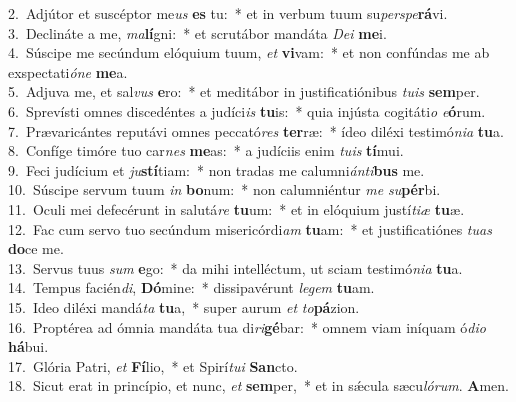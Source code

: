 {2.~}Adjútor et suscéptor me\textit{us} \textbf{es} tu:~* et in verbum tuum su\textit{per}\textit{spe}\textbf{rá}vi.\\
{3.~}Declináte a me, \textit{ma}\textbf{lí}gni:~* et scrutábor mandáta \textit{De}\textit{i} \textbf{me}i.\\
{4.~}Súscipe me secúndum elóquium tuum, \textit{et} \textbf{vi}vam:~* et non confúndas me ab exspectati\textit{ó}\textit{ne} \textbf{me}a.\\
{5.~}Adjuva me, et sal\textit{vus} \textbf{e}ro:~* et meditábor in justificatiónibus \textit{tu}\textit{is} \textbf{sem}per.\\
{6.~}Sprevísti omnes discedéntes a judíci\textit{is} \textbf{tu}is:~* quia injústa cogitáti\textit{o} \textit{e}\textbf{ó}rum.\\
{7.~}Prævaricántes reputávi omnes peccató\textit{res} \textbf{ter}ræ:~* ídeo diléxi testimó\textit{ni}\textit{a} \textbf{tu}a.\\
{8.~}Confíge timóre tuo car\textit{nes} \textbf{me}as:~* a judíciis enim \textit{tu}\textit{is} \textbf{tí}mui.\\
{9.~}Feci judícium et \textit{ju}\textbf{stí}tiam:~* non tradas me calumni\textit{án}\textit{ti}\textbf{bus} me.\\
{10.~}Súscipe servum tuum \textit{in} \textbf{bo}num:~* non calumniéntur \textit{me} \textit{su}\textbf{pér}bi.\\
{11.~}Oculi mei defecérunt in salutá\textit{re} \textbf{tu}um:~* et in elóquium justí\textit{ti}\textit{æ} \textbf{tu}æ.\\
{12.~}Fac cum servo tuo secúndum misericórdi\textit{am} \textbf{tu}am:~* et justificatiónes \textit{tu}\textit{as} \textbf{do}ce me.\\
{13.~}Servus tuus \textit{sum} \textbf{e}go:~* da mihi intelléctum, ut sciam testimó\textit{ni}\textit{a} \textbf{tu}a.\\
{14.~}Tempus facién\textit{di}, \textbf{Dó}mine:~* dissipavérunt \textit{le}\textit{gem} \textbf{tu}am.\\
{15.~}Ideo diléxi mandá\textit{ta} \textbf{tu}a,~* super aurum \textit{et} \textit{to}\textbf{pá}zion.\\
{16.~}Proptérea ad ómnia mandáta tua di\textit{ri}\textbf{gé}bar:~* omnem viam iníquam ó\textit{di}\textit{o} \textbf{há}bui.\\
{17.~}Glória Patri, \textit{et} \textbf{Fí}lio,~* et Spirí\textit{tu}\textit{i} \textbf{San}cto.\\
{18.~}Sicut erat in princípio, et nunc, \textit{et} \textbf{sem}per,~* et in sǽcula sæcu\textit{ló}\textit{rum}. \textbf{A}men.\\
